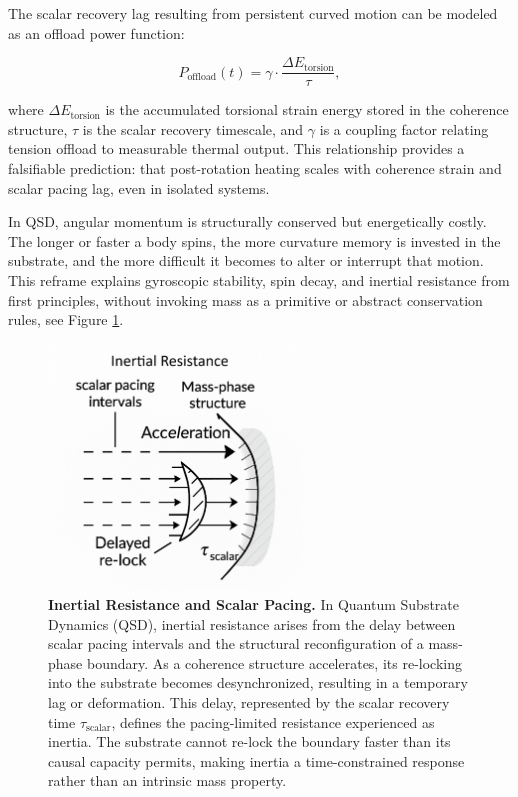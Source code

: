 \documentclass[entropy,article,submit,pdftex,moreauthors]{Definitions/mdpi}
\begin{document}
The scalar recovery lag resulting from persistent curved motion can be modeled as an offload power function:

\begin{equation}
    P_{\text{offload}}(t) = \gamma \cdot \frac{\Delta E_{\text{torsion}}}{\tau},
\end{equation}

where \( \Delta E_{\text{torsion}} \) is the accumulated torsional strain energy stored in the coherence structure, \( \tau \) is the scalar recovery timescale, and \( \gamma \) is a coupling factor relating tension offload to measurable thermal output. This relationship provides a falsifiable prediction: that post-rotation heating scales with coherence strain and scalar pacing lag, even in isolated systems.


In QSD, angular momentum is structurally conserved but energetically costly. The longer or faster a body spins, the more curvature memory is invested in the substrate, and the more difficult it becomes to alter or interrupt that motion. This reframe explains gyroscopic stability, spin decay, and inertial resistance from first principles, without invoking mass as a primitive or abstract conservation rules, see Figure \ref{fig:inertial-resistance}.

\begin{figure}[H]
    \centering
    \includegraphics[width=0.6\textwidth]{figures/inertia.png}
    \caption{
    \textbf{Inertial Resistance and Scalar Pacing.}
    In Quantum Substrate Dynamics (QSD), inertial resistance arises from the delay between scalar pacing intervals and the structural reconfiguration of a mass-phase boundary. As a coherence structure accelerates, its re-locking into the substrate becomes desynchronized, resulting in a temporary lag or deformation. This delay, represented by the scalar recovery time \( \tau_{\text{scalar}} \), defines the pacing-limited resistance experienced as inertia. The substrate cannot re-lock the boundary faster than its causal capacity permits, making inertia a time-constrained response rather than an intrinsic mass property.
    }
    \label{fig:inertial-resistance}
\end{figure}
\end{document}
